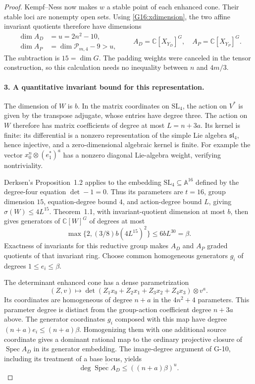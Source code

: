 \begin{proof}
Kempf--Ness now makes $w$ a stable point of each enhanced cone.
Their stable loci are nonempty open sets. Using
\eqref{G16:xdimension}, the two affine invariant quotients therefore
have dimensions
\begin{equation}\label{G16:quotdims}
 \begin{split}
 \dim A_D&=u=2n^2-10,\\
 \dim A_P&=\dim\mathcal P_{m,4}-9>u,
 \end{split}
 \qquad
 A_D=\mathbb C[X_{Y_D}]^G,\quad A_P=\mathbb C[X_{Y_P}]^G.
\end{equation}
The subtraction is $15=\dim G$. The padding weights were canceled
in the tensor construction, so this calculation needs no inequality
between $n$ and $4m/3$.

\paragraph{3. A quantitative invariant bound for this representation.}
The dimension of $W$ is $b$. In the matrix coordinates on
$\mathrm{SL}_4$, the action on $V^*$ is given by the transpose
adjugate, whose entries have degree three. The action on $W$
therefore has matrix coefficients of degree at most
$L=n+3a$. Its kernel is finite: its differential is a nonzero
representation of the simple Lie algebra $\mathfrak{sl}_4$, hence
injective, and a zero-dimensional algebraic kernel is finite.
For example the vector $x_0^n\otimes(e_1^*)^a$ has a nonzero
diagonal Lie-algebra weight, verifying nontriviality.

Derksen's Proposition~1.2 applies to the embedding
$\mathrm{SL}_4\subseteq\mathbb A^{16}$ defined by the degree-four
equation $\det-1=0$. Thus its parameters are $t=16$, group dimension
$15$, equation-degree bound $4$, and action-degree bound $L$, giving
$\sigma(W)\leq4L^{15}$.
Theorem~1.1, with invariant-quotient dimension at most $b$, then gives
generators of $\mathbb C[W]^G$ of degrees at most
\[
 \max\{2,(3/8)b(4L^{15})^2\}\leq6bL^{30}=\beta.
\]
Exactness of invariants for this reductive group makes $A_D$ and
$A_P$ graded quotients of that invariant ring. Choose common
homogeneous generators $g_i$ of degrees $1\leq e_i\leq\beta$.

The determinant enhanced cone has a dense parametrization
\[
 (Z,v)\longmapsto\det(Z_1x_0+Z_2x_1+Z_3x_2+Z_4x_3)\otimes v^a.
\]
Its coordinates are homogeneous of degree $n+a$ in the
$4n^2+4$ parameters. This parameter degree is distinct from the
group-action coefficient degree $n+3a$ above.
The generator coordinates $g_i$ composed with this map have degree
$(n+a)e_i\leq(n+a)\beta$.
Homogenizing them with one additional source coordinate gives a
dominant rational map to the ordinary projective closure of
$\operatorname{Spec}A_D$ in its generator embedding. The image-degree
argument of G-10, including its treatment of a base locus, yields
\[
 \deg\overline{\operatorname{Spec}A_D}
      \leq((n+a)\beta)^u.
\]


\end{proof}
